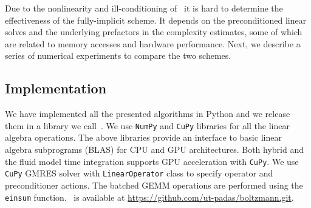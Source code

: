 Due to the nonlinearity and ill-conditioning of~ it is hard to determine the effectiveness of the fully-implicit scheme. It depends on the preconditioned linear solves and the underlying prefactors in the complexity estimates, some of which are related to memory accesses and hardware performance. Next, we describe a series of numerical experiments to compare the two schemes. %


\subsection{Implementation}
\label{subsec:implement_details}
We have implemented all the presented algorithms in Python and we release them in a library we call~\bte. We use \texttt{NumPy} and \texttt{CuPy} libraries for all the linear algebra operations. The above libraries provide an interface to basic linear algebra subprograms (BLAS) for CPU and GPU architectures. Both hybrid and the fluid model time integration supports GPU acceleration with \texttt{CuPy}. We use \texttt{CuPy} GMRES solver with \texttt{LinearOperator} class to specify operator and preconditioner actions. The batched GEMM operations are performed using the \texttt{einsum} function. \bte~is available at \url{https://github.com/ut-padas/boltzmann.git}.